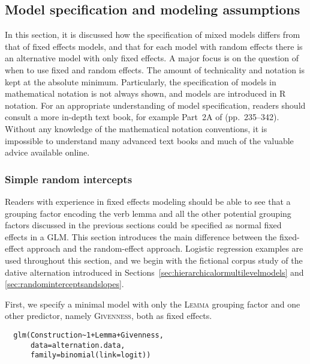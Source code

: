 \subsection{Model specification and modeling assumptions}
\label{sec:modelspecificationandmodelingassumptions}

In this section, it is discussed how the specification of mixed models differs from that of fixed effects models, and that for each model with random effects there is an alternative model with only fixed effects.
A major focus is on the question of when to use fixed and random effects.
The amount of technicality and notation is kept at the absolute minimum.
Particularly, the specification of models in mathematical notation is not always shown, and models are introduced in R notation.
For an appropriate understanding of model specification, readers should consult a more in-depth text book, for example Part~2A of \citet{GelmanHill2007} (pp.~235--342).
Without any knowledge of the mathematical notation conventions, it is impossible to understand many advanced text books and much of the valuable advice available online.

\subsubsection{Simple random intercepts}
\label{sec:simplerandomintercepts}

Readers with experience in fixed effects modeling should be able to see that a grouping factor encoding the verb lemma and all the other potential grouping factors discussed in the previous sections could be specified as normal fixed effects in a GLM.
This section introduces the main difference between the fixed-effect approach and the random-effect approach.
Logistic regression examples are used throughout this section, and we begin with the fictional corpus study of the dative alternation introduced in Sections~\ref{sec:hierarchicalormultilevelmodels} and \ref{sec:randominterceptsandslopes}.

First, we specify a minimal model with only the \textsc{Lemma} grouping factor and one other predictor, namely \textsc{Givenness}, both as fixed effects.

\begin{lstlisting}
  glm(Construction~1+Lemma+Givenness,
      data=alternation.data,
      family=binomial(link=logit))
\end{lstlisting}


